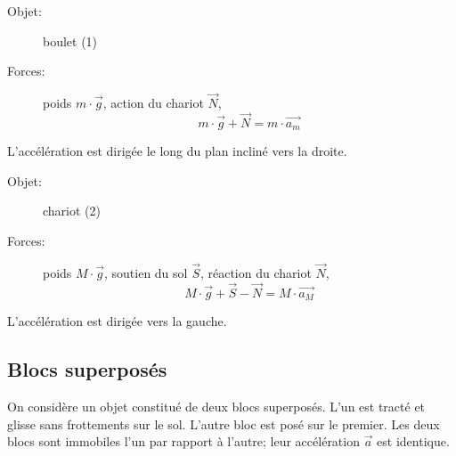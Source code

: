 \documentclass[
    11pt,
    a4paper,
    oneside,
    headinlcude, footinclude,
    twoside,
]{report}
\renewcommand{\vec}[1]{\overrightarrow{#1}}
\begin{document}
\begin{center}
    \begin{minipage}{.45\linewidth}
        \setlength{\parskip}{.3em}
        \begin{description}
            \item[Objet:] boulet (1)
            \item[Forces:]  poids $m \cdot \vec g$, action du chariot $\vec N$, 
                \begin{equation}
                    m \cdot \vec g + \vec N = m \cdot \vec{a_{m}}
                \end{equation}
        \end{description}
        L'accélération est dirigée le long du plan incliné vers la droite.
    \end{minipage}
    \hspace{1cm}
    \begin{minipage}{.45\linewidth}
        \setlength{\parskip}{.3em}
        \begin{description}
            \item[Objet:] chariot (2)
            \item[Forces:]  poids $M \cdot \vec g$, soutien du sol $\vec S$, réaction du chariot $\vec N$, 
                \begin{equation}
                    M \cdot \vec g + \vec S - \vec N = M \cdot \vec{a_{M}}
                \end{equation}
        \end{description}
        L'accélération est dirigée vers la gauche.\\
    \end{minipage}
\end{center}

\subsection{Blocs superposés}

On considère un objet constitué de deux blocs superposés. L'un est tracté et
glisse sans frottements sur le sol. L'autre bloc est posé sur le premier. Les
deux blocs sont immobiles l'un par rapport à l'autre; leur accélération $\vec a$
est identique.
\end{document}
